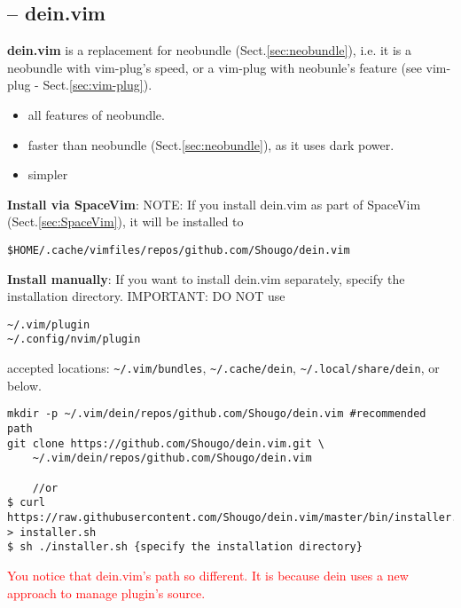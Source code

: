 \subsection{-- dein.vim}
\label{sec:dein.vim}

{\bf dein.vim} is a replacement for neobundle (Sect.\ref{sec:neobundle}), i.e.
it is a neobundle with vim-plug's speed, or a vim-plug with neobunle's feature
(see vim-plug - Sect.\ref{sec:vim-plug}).
 
\begin{itemize}
  \item all features of neobundle.
  \item faster than neobundle (Sect.\ref{sec:neobundle}), as it uses dark power.
  
  \item simpler
\end{itemize}

{\bf Install via SpaceVim}: NOTE: If you install dein.vim as part of SpaceVim
(Sect.\ref{sec:SpaceVim}), it will be installed to
\begin{verbatim}
$HOME/.cache/vimfiles/repos/github.com/Shougo/dein.vim
\end{verbatim}

{\bf Install manually}: If you want to install dein.vim separately, specify the
installation directory. IMPORTANT: DO NOT use
\begin{verbatim}
~/.vim/plugin
~/.config/nvim/plugin
\end{verbatim}
accepted locations: \verb!~/.vim/bundles!, \verb!~/.cache/dein!,
\verb!~/.local/share/dein!, or below. 
\begin{verbatim}
mkdir -p ~/.vim/dein/repos/github.com/Shougo/dein.vim #recommended path
git clone https://github.com/Shougo/dein.vim.git \
    ~/.vim/dein/repos/github.com/Shougo/dein.vim
    
    //or
$ curl https://raw.githubusercontent.com/Shougo/dein.vim/master/bin/installer.sh > installer.sh
$ sh ./installer.sh {specify the installation directory}
\end{verbatim}
\textcolor{red}{You notice that dein.vim's path so different. It is because dein
uses a new approach to manage plugin's source.}

